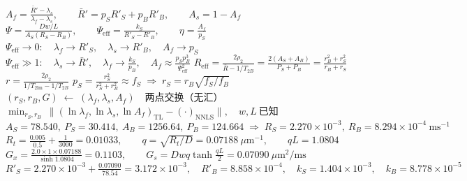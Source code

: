 \documentclass[border=3pt,multi=eqpage]{standalone}
\newenvironment{eqpage}{$\displaystyle}{$}
\begin{document}
\begin{eqpage}A_f=\frac{\bar R'-\lambda_s}{\lambda_f-\lambda_s},\qquad \bar R'=p_SR'_S+p_BR'_B,\qquad A_s=1-A_f\end{eqpage}
\begin{eqpage}\Psi=\frac{Dw/L}{A_S(R_S-R_B)},\qquad \Psi_{\mathrm{eff}}=\frac{k_S}{R'_S-R'_B},\qquad \eta=\frac{A_f}{p_S}\end{eqpage}
\begin{eqpage}\Psi_{\mathrm{eff}}\to0:\quad \lambda_f\to R'_S,\quad \lambda_s\to R'_B,\quad A_f\to p_S\end{eqpage}
\begin{eqpage}\Psi_{\mathrm{eff}}\gg1:\quad \lambda_s\to\bar R',\quad \lambda_f\to\frac{k_S}{p_B},\quad A_f\approx\frac{p_Sp_B^3}{\Psi_{\mathrm{eff}}^2}\end{eqpage}
\begin{eqpage}R_{\mathrm{eff}}=\frac{2\rho_2}{\bar R-1/T_{2B}}=\frac{2(A_S+A_B)}{P_S+P_B}=\frac{r_B^2+r_S^2}{r_B+r_S}\end{eqpage}
\begin{eqpage}r=\frac{2\rho_2}{1/T_{2\mathrm{lm}}-1/T_{2B}}\end{eqpage}
\begin{eqpage}p_S=\frac{r_S^2}{r_S^2+r_B^2}\approx f_S\;\Longrightarrow\;r_S=r_B\sqrt{f_S/f_B}\end{eqpage}
\begin{eqpage}(r_S,r_B,G)\;\leftarrow\;(\lambda_f,\lambda_s,A_f)\quad\text{两点交换（无汇）}\end{eqpage}
\begin{eqpage}\min_{r_S,r_B}\ \big\|(\ln\lambda_f,\ln\lambda_s,\ln A_f)_{\mathrm{TL}}-(\cdot)_{\mathrm{NNLS}}\big\|,\quad w,L\ \text{已知}\end{eqpage}
\begin{eqpage}A_S=78.540,\ P_S=30.414,\ A_B=1256.64,\ P_B=124.664\;\Rightarrow\;R_S=2.270\times10^{-3},\ R_B=8.294\times10^{-4}\ \mathrm{ms^{-1}}\end{eqpage}
\begin{eqpage}R_t=\frac{0.005}{0.5}+\frac{1}{3000}=0.01033,\qquad q=\sqrt{R_t/D}=0.07188\ \mu\mathrm{m}^{-1},\qquad qL=1.0804\end{eqpage}
\begin{eqpage}G_x=\frac{2.0\times1\times0.07188}{\sinh 1.0804}=0.1103,\qquad G_s=Dwq\tanh\frac{qL}{2}=0.07090\ \mu\mathrm{m^2/ms}\end{eqpage}
\begin{eqpage}R'_S=2.270\times10^{-3}+\frac{0.07090}{78.54}=3.172\times10^{-3},\quad R'_B=8.858\times10^{-4},\quad k_S=1.404\times10^{-3},\quad k_B=8.778\times10^{-5}\end{eqpage}
\end{document}
